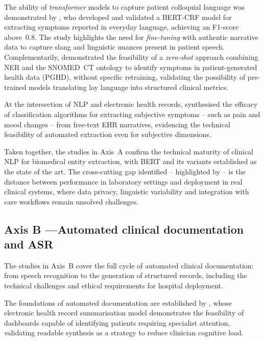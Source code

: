 \documentclass[review,12pt]{elsarticle}
\begin{document}
The ability of \textit{transformer} models to capture patient colloquial
language was demonstrated by \citet{Watabe2025}, who developed and validated a
BERT-CRF model for extracting symptoms reported in everyday language, achieving
an F1-score above~0.8. The study highlights the need for \textit{fine-tuning}
with authentic narrative data to capture slang and linguistic nuances present
in patient speech. Complementarily, \citet{Sezgin2023} demonstrated the
feasibility of a \textit{zero-shot} approach combining NER and the SNOMED~CT
ontology to identify symptoms in patient-generated health data (PGHD), without
specific retraining, validating the possibility of pre-trained models
translating lay language into structured clinical metrics.

At the intersection of NLP and electronic health records, \citet{Koleck2019}
synthesised the efficacy of classification algorithms for extracting subjective
symptoms -- such as pain and mood changes -- from free-text EHR narratives,
evidencing the technical feasibility of automated extraction even for
subjective dimensions.

Taken together, the studies in Axis~A confirm the technical maturity of
clinical NLP for biomedical entity extraction, with BERT and its variants
established as the state of the art. The cross-cutting gap identified --
highlighted by \citet{Navarro2023} -- is the distance between performance in
laboratory settings and deployment in real clinical systems, where data
privacy, linguistic variability and integration with care workflows remain
unsolved challenges.

\subsection{Axis B —Automated clinical documentation and ASR}
\label{subsec:eixoB}

The studies in Axis~B cover the full cycle of automated clinical
documentation: from speech recognition to the generation of structured
records, including the technical challenges and ethical requirements for
hospital deployment.

The foundations of automated documentation are established by
\citet{Aleksic2017}, whose electronic health record summarisation model
demonstrates the feasibility of dashboards capable of identifying patients
requiring specialist attention, validating readable synthesis as a strategy
to reduce clinician cognitive load.
\end{document}
